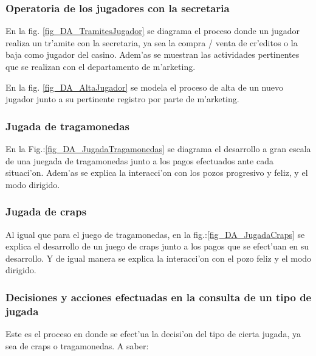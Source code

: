 \subsubsection{Operatoria de los jugadores con la secretaria}
En la fig. \ref{fig_DA_TramitesJugador} se diagrama el proceso donde un jugador realiza un tr'amite con la secretaria, ya sea la compra / venta de cr'editos o la baja como jugador del casino. Adem'as se muestran las actividades pertinentes que se realizan con el departamento de m'arketing. 


\clearpage

En la fig. \ref{fig_DA_AltaJugador} se modela el proceso de alta de un nuevo jugador junto a su pertinente registro por parte de m'arketing.



\clearpage




\subsubsection{Jugada de tragamonedas}
En la Fig.:\ref{fig_DA_JugadaTragamonedas} se diagrama el desarrollo a gran escala de una juegada de tragamonedas junto a los pagos efectuados ante cada situaci'on. Adem'as se explica la interacci'on con los pozos progresivo y feliz, y el modo dirigido.


\clearpage





\subsubsection{Jugada de craps}
Al igual que para el juego de tragamonedas, en la fig.:\ref{fig_DA_JugadaCraps} se explica el desarrollo de un juego de craps junto a los pagos que se efect'uan en su desarrollo. Y de igual manera se explica la interacci'on con el pozo feliz y el modo dirigido.


\clearpage





\subsubsection{Decisiones y acciones efectuadas en la consulta de un tipo de jugada}
Este es el proceso en donde se efect'ua la decisi'on del tipo de cierta jugada, ya sea de craps o tragamonedas. A saber:

